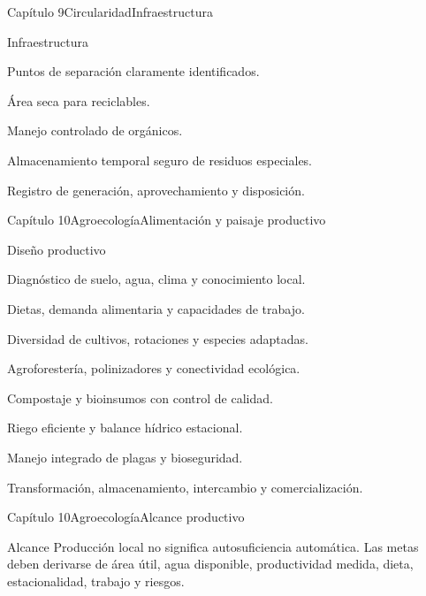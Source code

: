 \documentclass{../plantilla/hvtbook}
\begin{document}
\begin{HVTPage}{Capítulo 9}{Circularidad}{Infraestructura}
\begin{HVTTask}{Infraestructura}
  \item Puntos de separación claramente identificados.
  \item Área seca para reciclables.
  \item Manejo controlado de orgánicos.
  \item Almacenamiento temporal seguro de residuos especiales.
  \item Registro de generación, aprovechamiento y disposición.
\end{HVTTask}
\end{HVTPage}

\begin{HVTPage}{Capítulo 10}{Agroecología}{Alimentación y paisaje productivo}
\begin{HVTTask}{Diseño productivo}
  \item Diagnóstico de suelo, agua, clima y conocimiento local.
  \item Dietas, demanda alimentaria y capacidades de trabajo.
  \item Diversidad de cultivos, rotaciones y especies adaptadas.
  \item Agroforestería, polinizadores y conectividad ecológica.
  \item Compostaje y bioinsumos con control de calidad.
  \item Riego eficiente y balance hídrico estacional.
  \item Manejo integrado de plagas y bioseguridad.
  \item Transformación, almacenamiento, intercambio y comercialización.
\end{HVTTask}
\end{HVTPage}

\begin{HVTPage}{Capítulo 10}{Agroecología}{Alcance productivo}
\begin{HVTWarning}{Alcance}
Producción local no significa autosuficiencia automática. Las metas deben derivarse de área útil, agua disponible, productividad medida, dieta, estacionalidad, trabajo y riesgos.
\end{HVTWarning}
\end{HVTPage}
\end{document}
